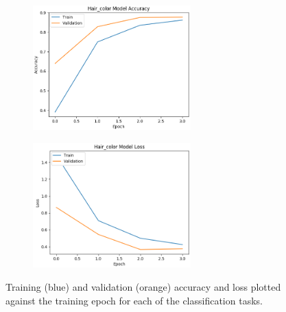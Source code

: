 \documentclass[10pt,twocolumn,letterpaper]{article}
\begin{document}
\begin{figure}[!htbp]
    \begin{subfigure}[t]{.45\linewidth}
    \centering
    \includegraphics[width=\linewidth, height=4.8cm]{Hair_color_model_accuracy.png}
  \end{subfigure}
  \hfill
  \begin{subfigure}[t]{.45\linewidth}
    \centering
    \includegraphics[width=\linewidth, height=4.8cm]{Hair_color_model_loss.png}
  \end{subfigure}
\caption{Training (blue) and validation (orange) accuracy and loss plotted against the training epoch for each of the classification tasks.}

\label{fig:learning_curves}

\end{figure}
\end{document}
